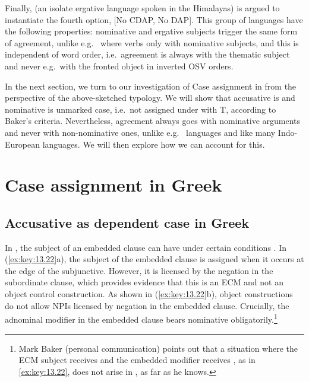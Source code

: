 \documentclass[output=paper]{langsci/langscibook}
\begin{document}
Finally,  (an isolate ergative language spoken in the Himalayas) is
argued to instantiate the fourth option, [No \gls{CDAP}, No \gls{DAP}]. This group of
languages have the following properties: nominative and ergative subjects
trigger the same form of agreement, unlike e.g.\  where verbs  only
with nominative subjects, and this is independent of word order, i.e.\ agreement
is always with the thematic subject and never e.g.\ with the fronted object in
inverted OSV orders.

In the next section, we turn to our investigation of Case assignment in
 from the perspective of the above-sketched typology. We will show
that accusative is  and
nominative is unmarked case, i.e.\ not assigned under
 with T, according to Baker’s criteria. Nevertheless, agreement
always goes with nominative arguments and never with
non-nominative ones, unlike e.g.\  languages and like many Indo-European
languages. We will then explore how we can account for this.

\section{Case assignment in Greek}

\subsection{Accusative as dependent case in Greek}

In , the subject of an embedded clause can have \Acc{} under certain
conditions \parencite{Iatridou1993,KotzPapa2007}. In (\ref{ex:key:13.22}a), the
subject of the embedded clause is assigned \Acc{} when it occurs at the edge of
the subjunctive. However, it is licensed by the negation in the subordinate
clause, which provides evidence that this is an \gls{ECM} and not an object
control construction. As shown in (\ref{ex:key:13.22}b), object 
constructions do not allow \glspl{NPI} licensed by negation in the embedded
clause.  Crucially, the adnominal modifier in the embedded clause bears
nominative obligatorily.\footnote{Mark Baker (personal
    communication) points out that a situation where the \gls{ECM} subject
receives \Acc{} and the embedded modifier receives \Nom{}, as in
\eqref{ex:key:13.22}, does not arise in , as far as he knows.}
\end{document}
